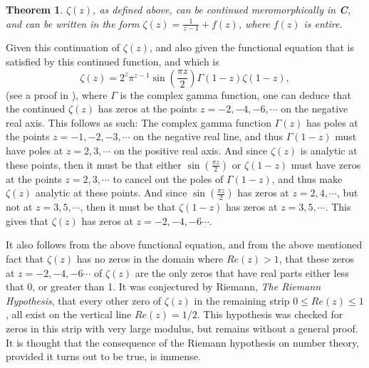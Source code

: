\documentclass[12pt,letterpaper]{book}
\newtheorem{theorem}{Theorem}
\begin{document}
\begin{theorem}
$\zeta(z)$, as defined above, can be continued meromorphically in
{\bf C}, and can be written in the form
$\zeta(z)=\frac{1}{z-1}+f(z)$, where $f(z)$ is entire.
\end{theorem}

Given this continuation of $\zeta(z)$, and also given the functional
equation that is satisfied by this continued function, and which is
\begin{equation}
\zeta(z)=2^z\pi^{z-1}\sin\left(\frac{\pi z}{2}\right)\Gamma(1-z)\zeta(1-z),
\end{equation}
(see a proof in \cite{Apostol}), where $\Gamma$ is the complex gamma
function, one can deduce that the continued $\zeta(z)$ has zeros at
the points $z=-2,-4,-6,\cdots$ on the negative real axis. This
follows as such: The complex gamma function $\Gamma(z)$ has poles at
the points $z=-1,-2,-3,\cdots$ on the negative real line, and thus
$\Gamma(1-z)$ must have poles at $z=2,3,\cdots$ on the positive real
axis. And since $\zeta(z)$ is analytic at these points, then it must
be that either $\sin\left(\frac{\pi z}{2}\right)$ or $\zeta(1-z)$
must have zeros at the points $z=2,3,\cdots$ to cancel out the poles
of $\Gamma(1-z)$, and thus make $\zeta(z)$ analytic at these points.
And since $\sin\left(\frac{\pi z}{2}\right)$ has zeros at
$z=2,4,\cdots$, but not at $z=3,5,\cdots$, then it must be that
$\zeta(1-z)$ has zeros at $z=3,5,\cdots$. This gives that $\zeta(z)$
has zeros at $z=-2,-4,-6\cdots$.

It also follows from the above functional equation, and from the
above mentioned fact that $\zeta(z)$ has no zeros in the domain
where $Re(z)>1$, that these zeros at $z=-2,-4,-6\cdots$ of
$\zeta(z)$ are the only zeros that have real parts either less that
0, or greater than 1.  It was conjectured
by Riemann, {\it The Riemann Hypothesis}, that every other zero of
$\zeta(z)$ in the remaining strip $0\leq Re(z)\leq 1$, all exist on
the vertical line $Re(z)=1/2$. This hypothesis was checked for zeros
in this strip with very large modulus, but remains without a general
proof. It is thought that the consequence of the Riemann hypothesis
on number theory, provided it turns out to be true, is immense.



\end{document}
